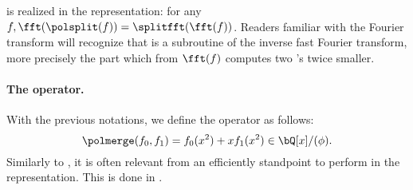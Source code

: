 \begin{algorithm}%
\caption{$\splitfft(\fft(f))$}\label{alg:splitfft}
 \begin{algorithmic}[1]
 \EndFor
 \end{algorithmic}
\end{algorithm}

\splitfft is \polsplit realized in the \fft representation: for any $f, \fft(\polsplit(f)) = \splitfft(\fft(f))$. Readers familiar with the Fourier transform will recognize that \splitfft is a subroutine of the inverse fast Fourier transform, more precisely the part which from $\fft(f)$ computes two \fft's twice smaller.

\paragraph{The \mergefft operator.} With the previous notations, we define the operator \polmerge as follows:
\begin{equation}\label{eq:merge}
\polmerge(f_0,f_1) = f_0(x^2) + xf_1(x^2) \in \bQ[x]/(\phi).
\end{equation}
Similarly to \polsplit, it is often relevant from an efficiently standpoint to perform \polmerge in the \fft representation. This is done in \longmergefft.

\begin{algorithm}%
\caption{$\mergefft(f_0,f_1)$}\label{alg:mergefft}
 \begin{algorithmic}[1]
 \EndFor
 \end{algorithmic}
\end{algorithm}

